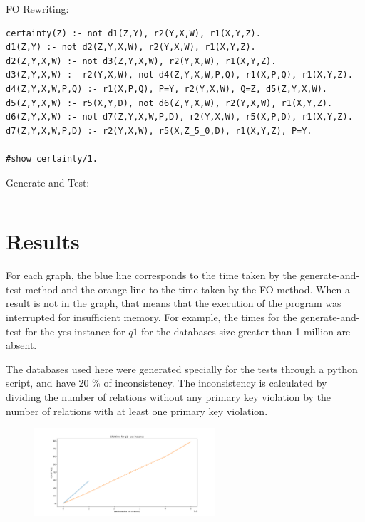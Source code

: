 \documentclass[acmsmall]{acmart}
\begin{document}
\begin{CCSXML}
FO Rewriting:
\begin{lstlisting}
certainty(Z) :- not d1(Z,Y), r2(Y,X,W), r1(X,Y,Z).
d1(Z,Y) :- not d2(Z,Y,X,W), r2(Y,X,W), r1(X,Y,Z).
d2(Z,Y,X,W) :- not d3(Z,Y,X,W), r2(Y,X,W), r1(X,Y,Z).
d3(Z,Y,X,W) :- r2(Y,X,W), not d4(Z,Y,X,W,P,Q), r1(X,P,Q), r1(X,Y,Z).
d4(Z,Y,X,W,P,Q) :- r1(X,P,Q), P=Y, r2(Y,X,W), Q=Z, d5(Z,Y,X,W).
d5(Z,Y,X,W) :- r5(X,Y,D), not d6(Z,Y,X,W), r2(Y,X,W), r1(X,Y,Z).
d6(Z,Y,X,W) :- not d7(Z,Y,X,W,P,D), r2(Y,X,W), r5(X,P,D), r1(X,Y,Z).
d7(Z,Y,X,W,P,D) :- r2(Y,X,W), r5(X,Z_5_0,D), r1(X,Y,Z), P=Y.

#show certainty/1.
\end{lstlisting}

Generate and Test:
\begin{lstlisting}
\end{lstlisting}



\section{Results}

For each graph, the blue line corresponds to the time taken by the
generate-and-test method and the orange line to the time taken by the FO
method. When a result is not in the graph, that means that the execution of the
program was interrupted for insufficient memory. For example, the times for the
generate-and-test for the yes-instance for $q1$ for the databases size greater
than 1 million are absent.

The databases used here were generated specially for the tests through a python
script, and have 20 \% of inconsistency. The inconsistency is calculated  by
dividing the number of relations without any primary key violation by the number of relations with at least one primary key violation.

\begin{figure}[H]
\includegraphics[width=0.6\textwidth]{time_q1_yesinstance.png}
\centering
\end{figure}


\end{CCSXML}
\end{document}
